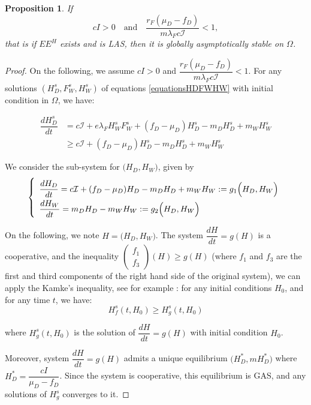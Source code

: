 \documentclass{article}
\newcommand{\lfw}{\lambda_{F}}
\newcommand{\lfw}{\lambda_{F}}
\newtheorem{prop}{Proposition}
\begin{document}
\begin{prop}\label{propEEHGAS}If 
$$
cI > 0 
\quad \text{and} \quad
\dfrac{r_F(\mu_D-f_D)}{m\lfw c\mathcal{I}} < 1,
$$
that is if $EE^{H}$ exists and is LAS, then it is globally asymptotically stable on $\Omega$.
\end{prop}

\begin{proof}
On the following, we assume $cI > 0$ and $\dfrac{r_F(\mu_D-f_D)}{m\lfw c\mathcal{I}} < 1$. For any solutions $(H_D^s, F_W^s, H_W^s)$ of equations \eqref{equationsHDFWHW} with initial condition in $\Omega$, we have:

\begin{align*}
\dfrac{dH_D^s}{dt} &= c\mathcal{I} + e\lfw H_W^s F_W^s + (f_D - \mu_D) H_D^s - m_D H_D^s + m_W H_W^s \\
&\geq c\mathcal{I} + (f_D - \mu_D) H_D^s - m_D H_D^s + m_W H_W^s
\end{align*}

We consider the sub-system for $\Big(H_D, H_W\Big)$, given by
\begin{equation}
\def\arraystretch{2}
\left\{ \begin{array}{l}
\dfrac{dH_D}{dt}= c\mathcal{I} + (f_D - \mu_D) H_D- m_D H_D + m_W H_W := g_1\Big(H_D, H_W\Big)\\
\dfrac{dH_W}{dt}= m_D H_D - m_W H_W := g_2\Big(H_D, H_W\Big)
\end{array}\right.
\label{limitSystem - eqH}
\end{equation}

On the following, we note $H = \Big(H_D, H_W\Big)$. The system $\dfrac{dH}{dt} = g(H)$ is a cooperative, and the inequality $\begin{pmatrix}
f_1 \\f_3 \end{pmatrix}(H) \geq g(H)$ (where $f_{1}$ and $f_3$ are the first and third components of the right hand side of the original system), we can apply the Kamke's inequality, see for example \cite{kirkilionis_comparison_2004}: for any initial conditions $H_0$, and for any time $t$, we have:
\begin{equation}
H_f^s(t, H_0) \geq H_g^s(t, H_0)
\label{inequalitySolution - eqH}
\end{equation}

where $H_g^s(t, H_0)$ is the solution of $\dfrac{dH}{dt} = g(H)$ with initial condition $H_0$.

Moreover, system $\dfrac{dH}{dt} = g(H)$ admits a unique equilibrium $\Big(H_D^*, mH_D^*\Big)$ where $H_D^* = \dfrac{cI}{\mu_D - f_D}$. Since the system is cooperative, this equilibrium is GAS, and any solutions of $H_g^s$ converges to it.


\end{proof}
\end{document}
